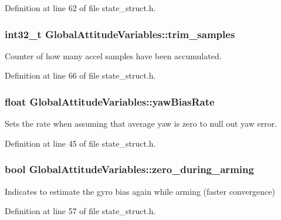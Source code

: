\-Definition at line 62 of file state\-\_\-struct.\-h.

\hypertarget{group___state_estimation_filters_ga9e5b2790cd84db83278b3c8c289ea411}{
\subsubsection[{trim\-\_\-samples}]{\setlength{\rightskip}{0pt plus 5cm}int32\-\_\-t {\bf \-Global\-Attitude\-Variables\-::trim\-\_\-samples}}}\label{group___state_estimation_filters_ga9e5b2790cd84db83278b3c8c289ea411}


\-Counter of how many accel samples have been accumulated. 



\-Definition at line 66 of file state\-\_\-struct.\-h.

\hypertarget{group___state_estimation_filters_ga0c53c008608a5724b2d563fd5b560905}{
\subsubsection[{yaw\-Bias\-Rate}]{\setlength{\rightskip}{0pt plus 5cm}float {\bf \-Global\-Attitude\-Variables\-::yaw\-Bias\-Rate}}}\label{group___state_estimation_filters_ga0c53c008608a5724b2d563fd5b560905}


\-Sets the rate when assuming that average yaw is zero to null out yaw error. 



\-Definition at line 45 of file state\-\_\-struct.\-h.

\hypertarget{group___state_estimation_filters_gaa625401f5bc69c19b54b3171703f37f9}{
\subsubsection[{zero\-\_\-during\-\_\-arming}]{\setlength{\rightskip}{0pt plus 5cm}bool {\bf \-Global\-Attitude\-Variables\-::zero\-\_\-during\-\_\-arming}}}\label{group___state_estimation_filters_gaa625401f5bc69c19b54b3171703f37f9}


\-Indicates to estimate the gyro bias again while arming (faster convergence) 



\-Definition at line 57 of file state\-\_\-struct.\-h.

